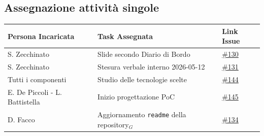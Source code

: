 \documentclass[a4paper, 10pt, colorlinks=true, linkcolor=black, urlcolor=blue, citecolor=blue, hidelinks]{article}
\newcommand{\issue}[1]{\href{https://github.com/thebitless-group-swe/thebitless.github.io/issues/#1}{\##1}}
\begin{document}
\subsection{Assegnazione attività singole}
\begin{center}
    \renewcommand{\arraystretch}{1.4}
        \begin{tabular}{|p{4.2cm}|p{6.2cm}|p{2.2cm}|}
        \hline
        \textbf{Persona Incaricata} & \textbf{Task Assegnata} & \centering\textbf{Link Issue} \tabularnewline
        \hline
        S. Zecchinato & Slide secondo Diario di Bordo & \issue{130} \\
        \hline
        S. Zecchinato & Stesura verbale interno 2026-05-12 & \issue{131} \\
        \hline
        Tutti i componenti & Studio delle tecnologie scelte & \issue{144} \\
        \hline
        E. De Piccoli - L. Battistella & Inizio progettazione PoC & \issue{145} \\
        \hline
        D. Facco & Aggiornamento \texttt{readme} della repository$_G$ & \issue{134} \\
        \hline
    \end{tabular}
\end{center}

\appendix
\end{document}
